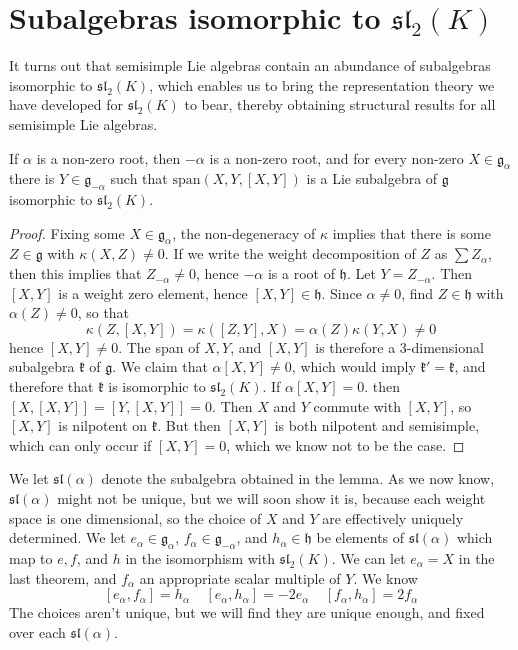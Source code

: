 \section{Subalgebras isomorphic to $\mathfrak{sl}_2(K)$}

It turns out that semisimple Lie algebras contain an abundance of subalgebras isomorphic to $\mathfrak{sl}_2(K)$, which enables us to bring the representation theory we have developed for $\mathfrak{sl}_2(K)$ to bear, thereby obtaining structural results for all semisimple Lie algebras.

\begin{lemma}
    If $\alpha$ is a non-zero root, then $-\alpha$ is a non-zero root, and for every non-zero $X \in \mathfrak{g}_\alpha$ there is $Y \in \mathfrak{g}_{-\alpha}$ such that $\text{span}(X,Y,[X,Y])$ is a Lie subalgebra of $\mathfrak{g}$ isomorphic to $\mathfrak{sl}_2(K)$.
\end{lemma}
\begin{proof}
    Fixing some $X \in \mathfrak{g}_\alpha$, the non-degeneracy of $\kappa$ implies that there is some $Z \in \mathfrak{g}$ with $\kappa(X,Z) \neq 0$. If we write the weight decomposition of $Z$ as $\sum Z_\alpha$, then this implies that $Z_{-\alpha} \neq 0$, hence $-\alpha$ is a root of $\mathfrak{h}$. Let $Y = Z_{-\alpha}$. Then $[X,Y]$ is a weight zero element, hence $[X,Y] \in \mathfrak{h}$. Since $\alpha \neq 0$, find $Z \in \mathfrak{h}$ with $\alpha(Z) \neq 0$, so that
    \[ \kappa(Z,[X,Y]) = \kappa([Z,Y],X) = \alpha(Z) \kappa(Y,X) \neq 0 \]
    hence $[X,Y] \neq 0$. The span of $X, Y$, and $[X,Y]$ is therefore a 3-dimensional subalgebra $\mathfrak{k}$ of $\mathfrak{g}$. We claim that $\alpha [X,Y] \neq 0$, which would imply $\mathfrak{k}' = \mathfrak{k}$, and therefore that $\mathfrak{k}$ is isomorphic to $\mathfrak{sl}_2(K)$. If $\alpha [X,Y] = 0$. then $[X,[X,Y]] = [Y,[X,Y]] = 0$. Then $X$ and $Y$ commute with $[X,Y]$, so $[X,Y]$ is nilpotent on $\mathfrak{k}$. But then $[X,Y]$ is both nilpotent and semisimple, which can only occur if $[X,Y] = 0$, which we know not to be the case.
\end{proof}

We let $\mathfrak{sl}(\alpha)$ denote the subalgebra obtained in the lemma. As we now know, $\mathfrak{sl}(\alpha)$ might not be unique, but we will soon show it is, because each weight space is one dimensional, so the choice of $X$ and $Y$ are effectively uniquely determined. We let $e_\alpha \in \mathfrak{g}_\alpha$, $f_\alpha \in \mathfrak{g}_{-\alpha}$, and $h_\alpha \in \mathfrak{h}$ be elements of $\mathfrak{sl}(\alpha)$ which map to $e,f$, and $h$ in the isomorphism with $\mathfrak{sl}_2(K)$. We can let $e_\alpha = X$ in the last theorem, and $f_\alpha$ an appropriate scalar multiple of $Y$. We know
%
\[ [e_\alpha, f_\alpha] = h_\alpha\ \ \ \ \ [e_\alpha, h_\alpha] = - 2 e_\alpha\ \ \ \ \ [f_\alpha, h_\alpha] = 2 f_\alpha \]
%
The choices aren't unique, but we will find they are unique enough, and fixed over each $\mathfrak{sl}(\alpha)$.

